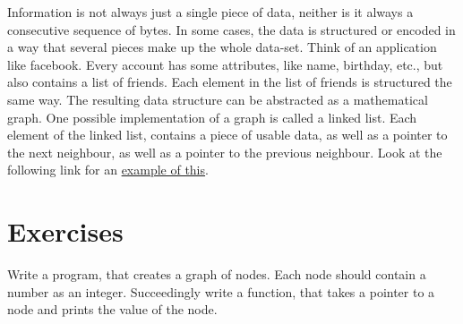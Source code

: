 \documentclass{dcbl/challenge}
\begin{document}
Information is not always just a single piece of data, neither is it always a consecutive sequence of bytes.
In some cases, the data is structured or encoded in a way that several pieces make up the whole data-set.
Think of an application like facebook. 
Every account has some attributes, like name, birthday, etc., but also contains a list of friends.
Each element in the list of friends is structured the same way. 
The resulting data structure can be abstracted as a mathematical graph.
One possible implementation of a graph is called a linked list.
Each element of the linked list, contains a piece of usable data, as well as a pointer to the next neighbour, as well as a pointer to the previous neighbour.
Look at the following link for an \href{https://godbolt.org/#g:!((g:!((g:!((h:codeEditor,i:(filename:'1',fontScale:14,fontUsePx:'0',j:1,lang:___c,selection:(endColumn:2,endLineNumber:31,positionColumn:2,positionLineNumber:31,selectionStartColumn:2,selectionStartLineNumber:31,startColumn:2,startLineNumber:31),source:'%23include+%3Cstdio.h%3E%0A%0Atypedef+struct+node+node%3B%0A%0Astruct+node%7B%0A++++++++int+data%3B%0A++++++++node*+next%3B%0A%7D%3B%0A%0Aint+main()%7B%0A++++++++node+a+%3D+%7B%0A++++++++++++++++.data+%3D+2,%0A++++++++++++++++.next+%3D+NULL%0A++++++++%7D%3B%0A%0A++++++++node+b+%3D+%7B%0A++++++++++++++++.data+%3D+4,%0A++++++++++++++++.next+%3D+NULL%0A++++++++%7D%3B%0A%0A++++++++a.next+%3D+%26b%3B%0A%0A++++++++printf(%22+++Adresse+von+a:+%25p%5Cn%22,+%26a)%3B%0A++++++++printf(%22++++Inhalt+von+a:+%25d%5Cn%22,+a.data)%3B%0A++++++++printf(%22N%C3%A4chstes+Element:+%25p%5Cn%22,+a.next)%3B%0A++++++++printf(%22+++Adresse+von+b:+%25p%5Cn%22,+%26b)%3B%0A++++++++printf(%22++++Inhalt+von+b:+%25d%5Cn%22,+b.data)%3B%0A++++++++printf(%22N%C3%A4chstes+Element:+%25p%5Cn%22,+b.next)%3B%0A%0A++++++++return+0%3B%0A%7D'),l:'5',n:'0',o:'C+source+%231',t:'0')),k:51.65615141955836,l:'4',n:'0',o:'',s:0,t:'0'),(g:!((h:executor,i:(argsPanelShown:'1',compilationPanelShown:'0',compiler:cg131,compilerName:'',compilerOutShown:'0',execArgs:'',execStdin:'',fontScale:14,fontUsePx:'0',j:1,lang:___c,libs:!(),options:'',overrides:!(),runtimeTools:!(),source:1,stdinPanelShown:'1',wrap:'1'),l:'5',n:'0',o:'Executor+x86-64+gcc+13.1+(C,+Editor+%231)',t:'0')),header:(),k:48.34384858044164,l:'4',n:'0',o:'',s:0,t:'0')),l:'2',n:'0',o:'',t:'0')),version:4}{example of this}.

\section*{Exercises}
\begin{aufgabe}
    Write a program, that creates a graph of nodes. 
    Each node should contain a number as an integer. 
    Succeedingly write a function, that takes a pointer to a node and prints the value of the node. 
\end{aufgabe}
\end{document}
